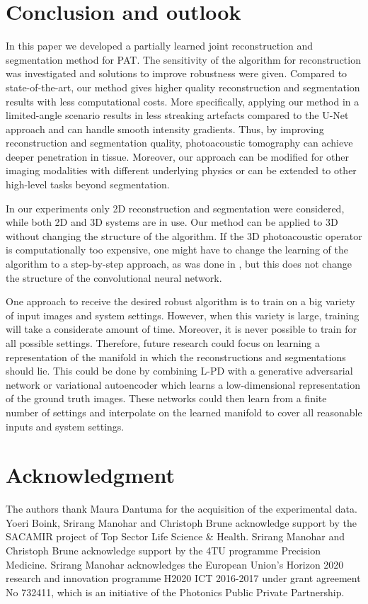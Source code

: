 \documentclass[journal]{IEEEtran}
\begin{document}
\section{Conclusion and outlook}\label{sec:conclusion}
In this paper we developed a partially learned joint reconstruction and segmentation method for PAT. The sensitivity of the algorithm for reconstruction was investigated and solutions to improve robustness were given. Compared to state-of-the-art, our method gives higher quality reconstruction and segmentation results with less computational costs. More specifically, applying our method in a limited-angle scenario results in less streaking artefacts compared to the U-Net approach and can handle smooth intensity gradients. Thus, by improving reconstruction and segmentation quality, photoacoustic tomography can achieve deeper penetration in tissue. Moreover, our approach can be modified for other imaging modalities with different underlying physics or can be extended to other high-level tasks beyond segmentation. 

In our experiments only 2D reconstruction and segmentation were considered, while both 2D \cite{Li2018} and 3D systems \cite{Toi2017} are in use. Our method can be applied to 3D without changing the structure of the algorithm. If the 3D photoacoustic operator is computationally too expensive, one might have to change the learning of the algorithm to a step-by-step approach, as was done in \cite{Hauptmann2018}, but this does not change the structure of the convolutional neural network.

One approach to receive the desired robust algorithm is to train on a big variety of input images and system settings. However, when this variety is large, training will take a considerate amount of time. Moreover, it is never possible to train for all possible settings. Therefore, future research could focus on learning a representation of the manifold in which the reconstructions and segmentations should lie. This could be done by combining L-PD with a generative adversarial network \cite{Goodfellow2014} or variational autoencoder \cite{Kingma2013} which learns a low-dimensional representation of the ground truth images. These networks could then learn from a finite number of settings and interpolate on the learned manifold to cover all reasonable inputs and system settings. 

\section*{Acknowledgment}
The authors thank Maura Dantuma for the acquisition of the experimental data. Yoeri Boink, Srirang Manohar and Christoph Brune acknowledge support by the SACAMIR project of Top Sector Life Science \& Health. Srirang Manohar and Christoph Brune acknowledge support by the 4TU programme Precision Medicine. Srirang Manohar acknowledges the European Union’s Horizon 2020 research and innovation programme H2020 ICT 2016-2017 under grant agreement No 732411, which is an initiative of the Photonics Public Private Partnership.

\ifCLASSOPTIONcaptionsoff
  \newpage
\fi

\small{

}
\end{document}
